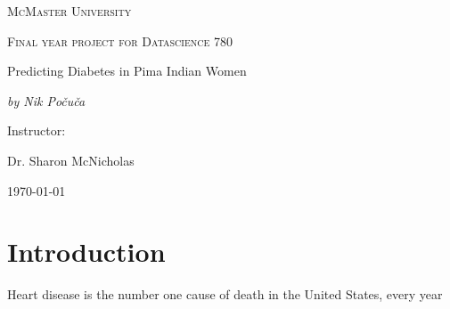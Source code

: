 \documentclass[11pt,letterpaper]{article}
\begin{document}
\begin{titlepage}
	\centering
	{\scshape\LARGE McMaster University \par}
	\vspace{1cm}
	{\scshape\Large Final year project for Datascience 780\par}
	\vspace{1.5cm}
	{\huge Predicting Diabetes in  Pima Indian Women \par}
	\vspace{2cm}
	{\Large\itshape by Nik Po\v cu\v ca\par}
	\vfill
	Instructor:  \par
	Dr. Sharon McNicholas 

	\vfill

	{\large \today\par}
\end{titlepage}

\section{Introduction}

Heart disease is the number one cause of death in the United States, every year 





%
%
 
\end{document}
